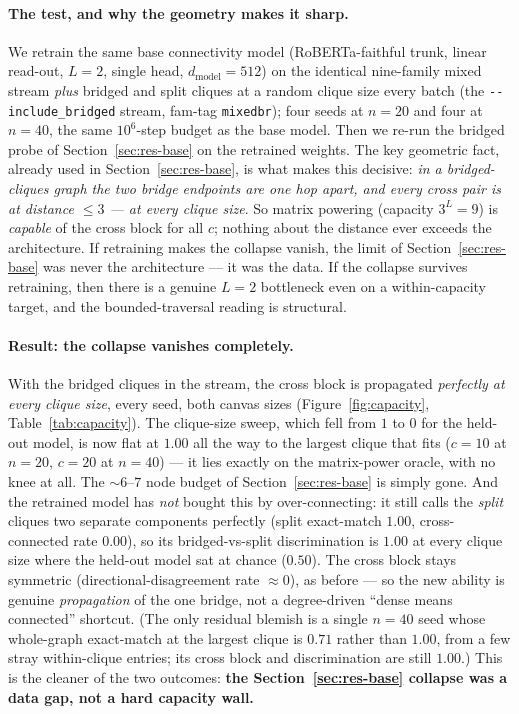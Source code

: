 \documentclass[11pt,a4paper]{article}
\begin{document}
\paragraph{The test, and why the geometry makes it sharp.} We retrain the same base connectivity
model (RoBERTa-faithful trunk, linear read-out, $L=2$, single head, $d_{\mathrm{model}}=512$) on the
identical nine-family mixed stream \emph{plus} bridged and split cliques at a random clique size every
batch (the \texttt{-{}-include\_bridged} stream, fam-tag \texttt{mixedbr}); four seeds at $n=20$ and
four at $n=40$, the same $10^6$-step budget as the base model. Then we re-run the bridged probe of
Section~\ref{sec:res-base} on the retrained weights. The key geometric fact, already used in
Section~\ref{sec:res-base}, is what makes this decisive: \emph{in a bridged-cliques graph the two
bridge endpoints are one hop apart, and every cross pair is at distance $\le 3$ --- at every clique
size}. So matrix powering (capacity $3^L=9$) is \emph{capable} of the cross block for all $c$;
nothing about the distance ever exceeds the architecture. If retraining makes the collapse vanish,
the limit of Section~\ref{sec:res-base} was never the architecture --- it was the data. If the
collapse survives retraining, then there is a genuine $L=2$ bottleneck even on a within-capacity
target, and the bounded-traversal reading is structural.

\paragraph{Result: the collapse vanishes completely.} With the bridged cliques in the stream, the
cross block is propagated \emph{perfectly at every clique size}, every seed, both canvas sizes
(Figure~\ref{fig:capacity}, Table~\ref{tab:capacity}). The clique-size sweep, which fell from $1$ to
$0$ for the held-out model, is now flat at $1.00$ all the way to the largest clique that fits ($c=10$
at $n=20$, $c=20$ at $n=40$) --- it lies exactly on the matrix-power oracle, with no knee at all. The
$\sim6$--$7$ node budget of Section~\ref{sec:res-base} is simply gone. And the retrained model has
\emph{not} bought this by over-connecting: it still calls the \emph{split} cliques two separate
components perfectly (split exact-match $1.00$, cross-connected rate $0.00$), so its
bridged-vs-split discrimination is $1.00$ at every clique size where the held-out model sat at chance
($0.50$). The cross block stays symmetric (directional-disagreement rate $\approx0$), as before ---
so the new ability is genuine \emph{propagation} of the one bridge, not a degree-driven ``dense means
connected'' shortcut. (The only residual blemish is a single $n=40$ seed whose whole-graph
exact-match at the largest clique is $0.71$ rather than $1.00$, from a few stray within-clique entries;
its cross block and discrimination are still $1.00$.) This is the cleaner of the two outcomes:
\textbf{the Section~\ref{sec:res-base} collapse was a data gap, not a hard capacity wall.}
\end{document}
